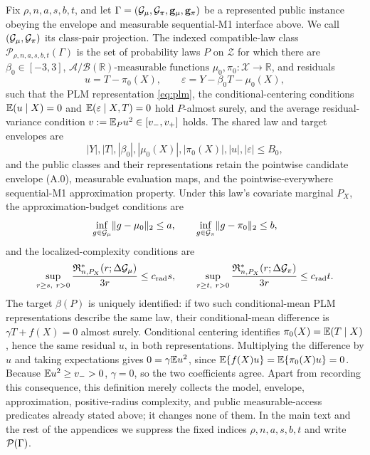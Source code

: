 \begin{definition}
\label{def:indexed-compatible-laws}
Fix \(\rho,n,a,s,b,t\), and let
\(\Gamma=(\mathcal G_\mu,\mathcal G_\pi,\mathbf g_\mu,\mathbf g_\pi)\) be a represented
public instance obeying the envelope and measurable sequential-M1 interface
above.  We call \((\mathcal G_\mu,\mathcal G_\pi)\) its class-pair projection.  The indexed compatible-law class
\(\mathcal P_{\rho,n,a,s,b,t}(\Gamma)\) is the set of probability laws
\(P\) on \(\mathcal Z\) for which there are
\(\beta_0\in[-3,3]\),
\(\mathcal A/\mathcal B(\mathbb R)\text{-measurable functions }\mu_0,\pi_0:\mathcal X\to\mathbb R\),
and residuals
\[
 u=T-\pi_0(X),\qquad
 \varepsilon=Y-\beta_0T-\mu_0(X),
\]
such that the PLM representation \eqref{eq:plm}, the conditional-centering
conditions
\(\mathbb E(u\mid X)=0\) and \(\mathbb E(\varepsilon\mid X,T)=0\) hold
\(P\)-almost surely, and the average residual-variance condition
\(v:=\mathbb E_P u^2\in[v_-,v_+]\) holds.  The shared law and target envelopes are
\[
 |Y|,|T|,|\beta_0|,|\mu_0(X)|,|\pi_0(X)|,|u|,|\varepsilon|
 \le B_0,
\]
and the public classes and their representations retain the pointwise
candidate envelope (A.0), measurable evaluation maps, and the
pointwise-everywhere sequential-M1 approximation property.  Under this
law's covariate marginal \(P_X\), the approximation-budget conditions are
\[
 \inf_{g\in\mathcal G_\mu}\lVert g-\mu_0\rVert_2\le a,
 \qquad
 \inf_{g\in\mathcal G_\pi}\lVert g-\pi_0\rVert_2\le b,
\]
and the localized-complexity conditions are
\[
 \sup_{r\ge s,\ r>0}
 \frac{\mathfrak R^{*}_{n,P_X}(r;\Delta\mathcal G_\mu)}{3r}
 \le c_{\rm rad}s,
 \qquad
 \sup_{r\ge t,\ r>0}
 \frac{\mathfrak R^{*}_{n,P_X}(r;\Delta\mathcal G_\pi)}{3r}
 \le c_{\rm rad}t.
\]
The target \(\beta(P)\) is uniquely identified: if two such conditional-mean
PLM representations describe the same law, their conditional-mean difference
is \(\gamma T+f(X)=0\) almost surely.  Conditional centering identifies
\(\pi_0(X)=\mathbb E(T\mid X)\), hence the same residual \(u\), in both
representations.  Multiplying the difference by \(u\) and taking
expectations gives \(0=\gamma\mathbb E u^2\), since
\(\mathbb E\{f(X)u\}=\mathbb E\{\pi_0(X)u\}=0\).  Because
\(\mathbb E u^2\ge v_->0\), \(\gamma=0\), so the two coefficients agree.
Apart from recording this consequence, this
definition merely collects the model, envelope, approximation,
positive-radius complexity, and public measurable-access predicates already
stated above; it changes none of them.  In the main text and the rest of the
appendices we suppress the fixed indices \(\rho,n,a,s,b,t\) and write
\(\mathcal P(\Gamma)\).
\end{definition}

